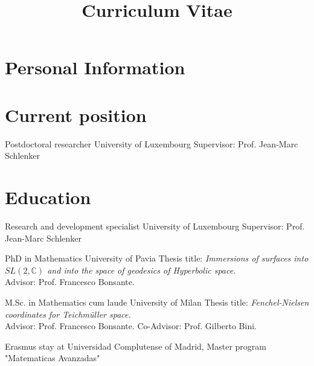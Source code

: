 \documentclass[11pt,a4paper,sans]{moderncv}
\title{Curriculum Vitae}
\begin{document}
\maketitle


\section{Personal Information}







\section{Current position}

{Postdoctoral researcher}
{University of Luxembourg}
{}
{}
{Supervisor: Prof. Jean-Marc Schlenker}






\section{Education}



{Research and development specialist}
{University of Luxembourg}
{}
{}
{Supervisor: Prof. Jean-Marc Schlenker}


{PhD in Mathematics}
{University of Pavia}
{}
{}
{Thesis title: \emph{Immersions of surfaces into $SL(2,\mathbb C)$ and into the space of geodesics of Hyperbolic space.}\\
	Advisor: Prof. Francesco Bonsante. \medskip
}



{M.Sc. in Mathematics cum laude}
{University of Milan}
{}
{}
{Thesis title: \emph{Fenchel-Nielsen coordinates for Teichm\"uller space.}\\
Advisor: Prof. Francesco Bonsante. Co-Advisor: Prof. Gilberto Bini.\medskip
}

{Erasmus stay} 
{at Universidad Complutense of Madrid, Master program "Matematicas Avanzadas"}
{}
{}
{}
\end{document}
